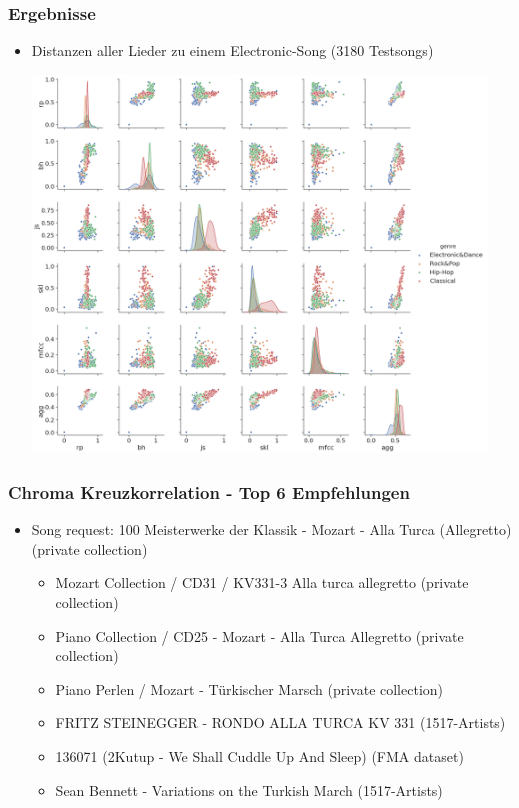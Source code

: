 \documentclass[12pt]{FSUBeamer_official}
\begin{document}
\begin{frame}
	\frametitle{Ergebnisse}
	\begin{itemize}
		\item Distanzen aller Lieder zu einem Electronic-Song (3180 Testsongs)
		\begin{minipage}[b]{0.75\linewidth}
			\centering
			\includegraphics[width=0.95\textwidth]{pics/SparkFeat/electronic.png}	
		\end{minipage}
	\end{itemize}
\end{frame}

\begin{frame}
	\frametitle{Chroma Kreuzkorrelation - Top 6 Empfehlungen}
	\begin{itemize}
		\item Song request: 100 Meisterwerke der Klassik - Mozart - Alla Turca (Allegretto) (private
		collection)
		\begin{itemize}
			\item Mozart Collection / CD31 / KV331-3 Alla turca allegretto (private collection)
			\item Piano Collection / CD25 - Mozart - Alla Turca Allegretto (private collection)
			\item Piano Perlen / Mozart - Türkischer Marsch (private collection)
			\item FRITZ STEINEGGER - RONDO ALLA TURCA KV 331 (1517-Artists)
			\item 136071 (2Kutup - We Shall Cuddle Up And Sleep) (FMA dataset)
			\item Sean Bennett - Variations on the Turkish March (1517-Artists)
		\end{itemize}
	\end{itemize}
\end{frame}
\end{document}
